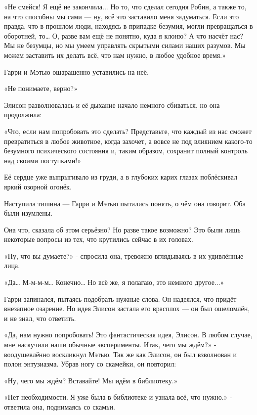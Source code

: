 \documentclass[a4paper,12pt]{book}
\begin{document}
\par
«Не смейся! Я ещё не закончила... Но то, что сделал сегодня Робин, а также то, на что способны мы сами — ну, всё это заставило меня задуматься. Если это правда, что в прошлом люди, находясь в припадке безумия, могли превращаться в оборотней, то… О, разве вам ещё не понятно, куда я клоню? А что насчёт нас? Мы не безумцы, но мы умеем управлять скрытыми силами наших разумов. Мы можем заставить их делать всё, что нам нужно, в любое удобное время.»
\par
Гарри и Мэтью ошарашенно уставились на неё.
\par
«Не понимаете, верно?»
\par
Элисон разволновалась и её дыхание начало немного сбиваться, но она продолжила:
\par
«Что, если нам попробовать это сделать? Представьте, что каждый из нас сможет превратиться в любое животное, когда захочет, а вовсе не под влиянием какого-то безумного психического состояния и, таким образом, сохранит полный контроль над своими поступками!»\\
\par
Её сердце уже выпрыгивало из груди, а в глубоких карих глазах поблёскивал яркий озорной огонёк.
\par
Наступила тишина — Гарри и Мэтью пытались понять, о чём она говорит. Оба были изумлены.
\par
Она что, сказала об этом серьёзно? Но разве такое возможно? Это были лишь некоторые вопросы из тех, что крутились сейчас в их головах.
\par
«Ну, что вы думаете?» - спросила она, тревожно вглядываясь в их удивлённые лица.
\par
«Да… М-м-м-м… Конечно… Но всё же, я полагаю, это немного другое...»
\par
Гарри запинался, пытаясь подобрать нужные слова. Он надеялся, что придёт внезапное озарение. Но идея Элисон застала его врасплох — он был ошеломлён, и не знал, что ответить.
\par
«Да, нам нужно попробовать! Это фантастическая идея, Элисон. В любом случае, мне наскучили наши обычные эксперименты. Итак, чего мы ждём?» - воодушевлённо воскликнул Мэтью. Так же как Элисон, он был взволнован и полон энтузиазма. Убрав ногу со скамейки, он повторил:
\par
«Ну, чего мы ждём? Вставайте! Мы идём в библиотеку.»
\par
«Нет необходимости. Я уже была в библиотеке и узнала всё, что нужно.» - ответила она, поднимаясь со скамьи.
\par
\end{document}

